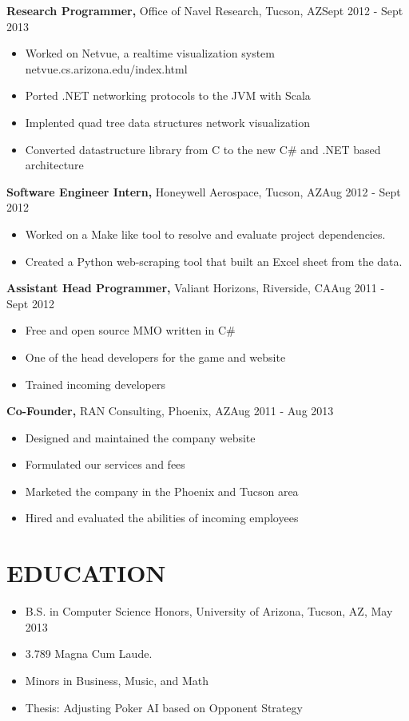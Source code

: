 \documentclass{res}
\begin{document}
\begin{resume}
  {\bf Research Programmer,} Office of Navel Research, Tucson, AZ\hfill Sept 2012 - Sept 2013
  \begin{itemize} \itemsep -2pt %
    \item Worked on Netvue, a realtime visualization system netvue.cs.arizona.edu/index.html
    \item Ported .NET networking protocols to the JVM with Scala
    \item Implented quad tree data structures network visualization
    \item Converted datastructure library from C to the new C\# and .NET based architecture
  \end{itemize}

  {\bf Software Engineer Intern,} Honeywell Aerospace, Tucson, AZ\hfill Aug 2012 - Sept 2012
  \begin{itemize} \itemsep -2pt %
    \item Worked on a Make like tool to resolve and evaluate project dependencies.
    \item Created a Python web-scraping tool that built an Excel sheet from the data.
  \end{itemize}

  {\bf Assistant Head Programmer,} Valiant Horizons, Riverside, CA\hfill Aug 2011 - Sept 2012
  \begin{itemize} \itemsep -2pt %
    \item Free and open source MMO written in C\#
    \item One of the head developers for the game and website
    \item Trained incoming developers
  \end{itemize}

  {\bf Co-Founder,} RAN Consulting, Phoenix, AZ\hfill Aug 2011 - Aug 2013
  \begin{itemize} \itemsep -2pt %
    \item Designed and maintained the company website
    \item Formulated our services and fees
    \item Marketed the company in the Phoenix and Tucson area
    \item Hired and evaluated the abilities of incoming employees
  \end{itemize}

\section{EDUCATION} 
  \begin{itemize} \itemsep -2pt %
    \item B.S. in Computer Science Honors, University of Arizona, Tucson, AZ, May 2013
    \item 3.789 Magna Cum Laude. 
    \item Minors in Business, Music, and Math
    \item Thesis: Adjusting Poker AI based on Opponent Strategy
  \end{itemize}


\end{resume}
\end{document}
